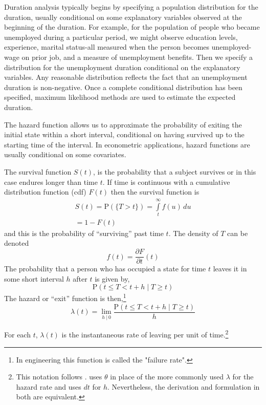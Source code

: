 \documentclass[
  11pt,
]{article}
\begin{document}
Duration analysis typically begins by specifying a population
distribution for the duration, usually conditional on some explanatory
variables observed at the beginning of the duration. For example, for
the population of people who became unemployed during a particular
period, we might observe education levels, experience, marital
status-all measured when the person becomes unemployed-wage on prior
job, and a measure of unemployment benefits. Then we specify a
distribution for the unemployment duration conditional on the
explanatory variables. Any reasonable distribution reflects the fact
that an unemployment duration is non-negative. Once a complete
conditional distribution has been specified, maximum likelihood methods
are used to estimate the expected duration.

The hazard function allows us to approximate the probability of exiting
the initial state within a short interval, conditional on having
survived up to the starting time of the interval. In econometric
applications, hazard functions are usually conditional on some
covariates.

The survival function \(S(t)\), is the probability that a subject
survives or in this case endures longer than time \(t\). If time is
continuous with a cumulative distribution function (cdf) \(F(t)\) then
the survival function is \begin{equation}
\begin{gathered}
S(t) = \mathrm{P}(\{T > t\}) = \int\limits_{t}^{\infty} f(u)\, du \\[8pt]
= 1 - F(t)
\end{gathered}
\end{equation} and this is the probability of ``surviving'' past time
\(t\). The density of \(T\) can be denoted \[
f(t) = \frac{\partial F}{\partial t}(t)
\] The probability that a person who has occupied a state for time \(t\)
leaves it in some short interval \(h\) after \(t\) is given by, \[
\mathrm{P}(t \leq T < t + h \; | \; T \geq t)
\] The hazard or ``exit'' function is
then,\footnote{In engineering this function is called the "failure rate".}
\begin{equation}
\lambda(t) = \lim_{h \;|\, 0} \frac{\mathrm{P}(t \leq T < t + h \; | \; T \geq t)}{h}
\end{equation}

For each \(t\), \(\lambda(t)\) is the instantaneous rate of leaving per
unit of
time.\footnote{This notation follows \cite{Wool01}. \cite{Lanc90} uses $\theta$ in place of the more commonly used $\lambda$ for the hazard rate and uses $dt$ for $h$. Nevertheless, the derivation and formulation in both are equivalent.}
\end{document}

